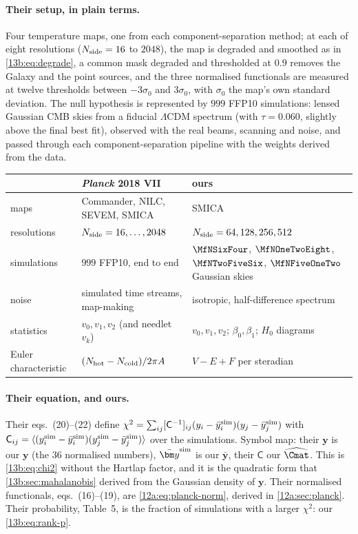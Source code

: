 \paragraph{Their setup, in plain terms.} Four temperature maps, one from each component-separation method; at each of
eight resolutions ($N_{\rm side}=16$ to $2048$), the map is degraded and smoothed as in \eqref{13b:eq:degrade}, a
common mask degraded and thresholded at $0.9$ removes the Galaxy and the point sources, and the three normalised
functionals are measured at twelve thresholds between $-3\sigma_0$ and $3\sigma_0$, with $\sigma_0$ the map's own
standard deviation. The null hypothesis is represented by $999$ FFP10 simulations: lensed Gaussian CMB skies from a
fiducial $\Lambda$CDM spectrum (with $\tau=0.060$, slightly above the final best fit), observed with the real beams,
scanning and noise, and passed through each component-separation pipeline with the weights derived from the data.

\begin{center}
\small
\begin{tabular}{lll}
\toprule
 & \textit{Planck} 2018 VII & ours\\
\midrule
maps & Commander, NILC, SEVEM, SMICA & SMICA\\
resolutions & $N_{\rm side}=16,\dots,2048$ & $N_{\rm side}=64,128,256,512$\\
simulations & $999$ FFP10, end to end & $\MfNSixFour$, $\MfNOneTwoEight$, $\MfNTwoFiveSix$, $\MfNFiveOneTwo$ Gaussian skies\\
noise & simulated time streams, map-making & isotropic, half-difference spectrum\\
statistics & $v_0,v_1,v_2$ (and needlet $v_k$) & $v_0,v_1,v_2$; $\beta_0,\beta_1$; $H_0$ diagrams\\
Euler characteristic & $(N_{\rm hot}-N_{\rm cold})/2\pi A$ & $V-E+F$ per steradian\\
\bottomrule
\end{tabular}
\end{center}

\paragraph{Their equation, and ours.} Their eqs.~(20)--(22) define
$\chi^2=\sum_{ij}[\mathsf C^{-1}]_{ij}(y_i-\bar y_i^{\rm sim})(y_j-\bar y_j^{\rm sim})$ with
$\mathsf C_{ij}=\langle(y_i^{\rm sim}-\bar y_i^{\rm sim})(y_j^{\rm sim}-\bar y_j^{\rm sim})\rangle$ over the simulations.
Symbol map: their $\bm y$ is our $\bm y$ (the $36$ normalised numbers), $\bar{\bm y}^{\rm sim}$ is our $\bar{\bm y}$, their
$\mathsf C$ our $\widehat{\Cmat}$. This is \eqref{13b:eq:chi2} without the Hartlap factor, and it is the quadratic form
that \cref{13b:sec:mahalanobis} derived from the Gaussian density of $\bm y$. Their normalised functionals, eqs.~(16)--(19),
are \eqref{12a:eq:planck-norm}, derived in \cref{12a:sec:planck}. Their probability, Table~5, is the fraction of simulations with
a larger $\chi^2$: our \eqref{13b:eq:rank-p}.

